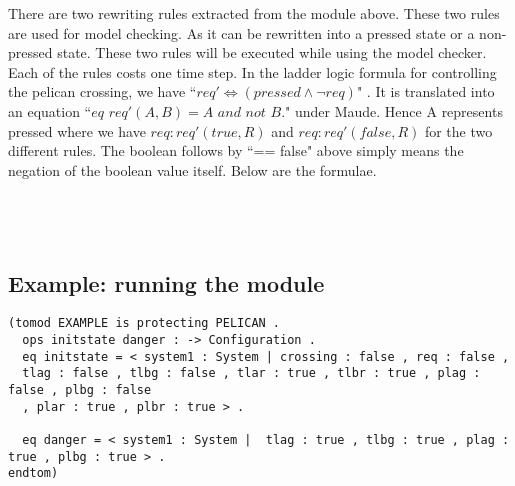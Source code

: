 \documentclass{article}
\begin{document}
There are two rewriting rules extracted from the module above. These two rules are used for model checking. As it can be rewritten into a pressed state or a non-pressed state. These two rules will be executed while using the model checker. Each of the rules costs one time step. In the ladder logic formula for controlling the pelican crossing, we have ``$req' \Leftrightarrow (pressed \wedge \neg req)$" . It is translated into an equation ``$eq$ $req'(A,B) = A$ $and$ $not$ $B .$" under Maude. Hence A represents pressed where we have $req : req'(true,R)$ and $req :req'(false,R)$ for the two different rules. The boolean follows by ``== false" above simply means the negation of the boolean value itself.
Below are the formulae.\\\\
\\\\

\newpage
\subsection{Example: running the module}

\begin{verbatim}
(tomod EXAMPLE is protecting PELICAN .
  ops initstate danger : -> Configuration .
  eq initstate = < system1 : System | crossing : false , req : false , 
  tlag : false , tlbg : false , tlar : true , tlbr : true , plag : false , plbg : false 
  , plar : true , plbr : true > .

  eq danger = < system1 : System |  tlag : true , tlbg : true , plag : true , plbg : true > .
endtom)
\end{verbatim}
\end{document}
